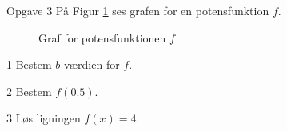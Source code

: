 \documentclass[12pt,x11names,a4paper]{article}
\begin{document}
\newpage
\begin{opgavetekst}{Opgave 3}
	På Figur \ref{fig:potensgraf} ses grafen for en potensfunktion $f$.
	\begin{figure}[H]
		\centering
		\caption{Graf for potensfunktionen $f$}
		\label{fig:potensgraf}
	\end{figure}
	\phantom{h}
\end{opgavetekst}
\begin{delopgave}{}{1}
	Bestem $b$-værdien for $f$.
\end{delopgave}
\begin{delopgave}{}{2}
	Bestem $f(0.5)$.
\end{delopgave}
\begin{delopgave}{}{3}
	Løs ligningen $f(x) = 4$.
\end{delopgave}
\end{document}
